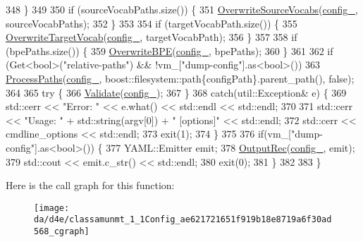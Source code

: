 \begin{DoxyCode}
348   \}
349 
350   \textcolor{keywordflow}{if} (sourceVocabPaths.size()) \{
351     \hyperlink{namespaceamunmt_a343a63d53ad92c670141e5740f3eab7a}{OverwriteSourceVocabs}(\hyperlink{classamunmt_1_1Config_a82fa4e3a8aa7d62c2d1a568d71392ce8}{config\_}, sourceVocabPaths);
352   \}
353 
354   \textcolor{keywordflow}{if} (targetVocabPath.size()) \{
355     \hyperlink{namespaceamunmt_a1b4b3e3a5cfcb79de4fd92c34e3fa4e3}{OverwriteTargetVocab}(\hyperlink{classamunmt_1_1Config_a82fa4e3a8aa7d62c2d1a568d71392ce8}{config\_}, targetVocabPath);
356   \}
357 
358   \textcolor{keywordflow}{if} (bpePaths.size()) \{
359     \hyperlink{namespaceamunmt_a3d7f2e636dd3e33b80855722d08f9a18}{OverwriteBPE}(\hyperlink{classamunmt_1_1Config_a82fa4e3a8aa7d62c2d1a568d71392ce8}{config\_}, bpePaths);
360   \}
361 
362   \textcolor{keywordflow}{if} (Get<bool>(\textcolor{stringliteral}{"relative-paths"}) && !vm\_[\textcolor{stringliteral}{"dump-config"}].as<bool>())
363     \hyperlink{namespaceamunmt_aa294dffea2547350d8ba90401bbe85d1}{ProcessPaths}(\hyperlink{classamunmt_1_1Config_a82fa4e3a8aa7d62c2d1a568d71392ce8}{config\_}, boost::filesystem::path\{configPath\}.parent\_path(), \textcolor{keyword}{false});
364 
365   \textcolor{keywordflow}{try} \{
366     \hyperlink{namespaceamunmt_ad51b66163a1437dc0ffd4aedbb0bd067}{Validate}(\hyperlink{classamunmt_1_1Config_a82fa4e3a8aa7d62c2d1a568d71392ce8}{config\_});
367   \}
368   \textcolor{keywordflow}{catch}(util::Exception& e) \{
369     std::cerr << \textcolor{stringliteral}{"Error: "} << e.what() << std::endl << std::endl;
370 
371     std::cerr << \textcolor{stringliteral}{"Usage: "} + std::string(argv[0]) +  \textcolor{stringliteral}{" [options]"} << std::endl;
372     std::cerr << cmdline\_options << std::endl;
373     exit(1);
374   \}
375 
376   \textcolor{keywordflow}{if}(vm\_[\textcolor{stringliteral}{"dump-config"}].as<bool>()) \{
377     YAML::Emitter emit;
378     \hyperlink{namespaceamunmt_aef479ee5514fb431474e91580190fd39}{OutputRec}(\hyperlink{classamunmt_1_1Config_a82fa4e3a8aa7d62c2d1a568d71392ce8}{config\_}, emit);
379     std::cout << emit.c\_str() << std::endl;
380     exit(0);
381   \}
382 
383 \}
\end{DoxyCode}


Here is the call graph for this function\+:
\nopagebreak
\begin{figure}[H]
\begin{center}
\leavevmode
\texttt{[image: da/d4e/classamunmt\_1\_1Config\_ae621721651f919b18e8719a6f30ad568\_cgraph]}
\end{center}
\end{figure}





